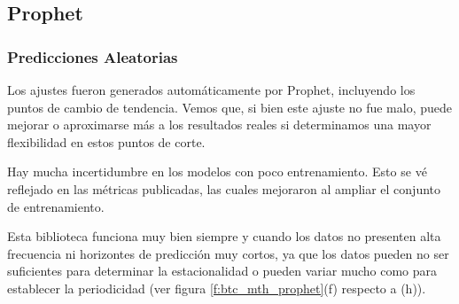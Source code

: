 \documentclass[a4paper,10pt]{article}
\begin{document}
\subsection{Prophet}

\subsubsection{Predicciones Aleatorias}

Los ajustes fueron generados automáticamente por Prophet, incluyendo los puntos de cambio de tendencia. Vemos que, si bien este ajuste no fue malo, puede mejorar o aproximarse más a los resultados reales si determinamos una mayor flexibilidad en estos puntos de corte.

Hay mucha incertidumbre en los modelos con poco entrenamiento. Esto se vé reflejado en las métricas publicadas, las cuales mejoraron al ampliar el conjunto de entrenamiento.

Esta biblioteca funciona muy bien siempre y cuando los datos no presenten alta frecuencia ni horizontes de predicción muy cortos, ya que los datos pueden no ser suficientes para
determinar la estacionalidad o pueden variar mucho como para establecer la periodicidad (ver figura \ref{f:btc_mth_prophet}(f) respecto a (h)).
\end{document}

